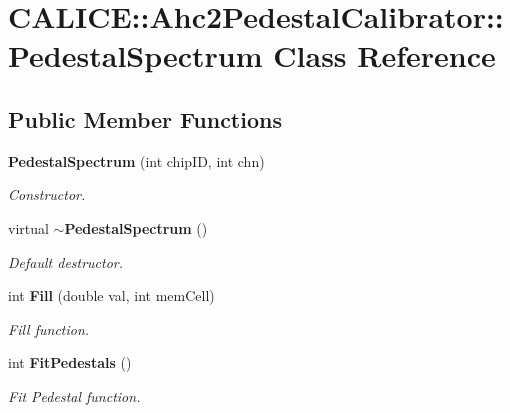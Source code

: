 \section{CALICE::Ahc2PedestalCalibrator::PedestalSpectrum Class Reference}
\label{classCALICE_1_1Ahc2PedestalCalibrator_1_1PedestalSpectrum}
\subsection*{Public Member Functions}
\begin{DoxyCompactItemize}
\item 
{\bf PedestalSpectrum} (int chipID, int chn)
\begin{DoxyCompactList}\small\item\em Constructor. \item\end{DoxyCompactList}\item 
virtual {\bf $\sim$PedestalSpectrum} ()\label{classCALICE_1_1Ahc2PedestalCalibrator_1_1PedestalSpectrum_a8d608d0c276148d7d197361cc75d0fd7}

\begin{DoxyCompactList}\small\item\em Default destructor. \item\end{DoxyCompactList}\item 
int {\bf Fill} (double val, int memCell)
\begin{DoxyCompactList}\small\item\em Fill function. \item\end{DoxyCompactList}\item 
int {\bf FitPedestals} ()
\begin{DoxyCompactList}\small\item\em Fit Pedestal function. \item\end{DoxyCompactList}\end{DoxyCompactItemize}
